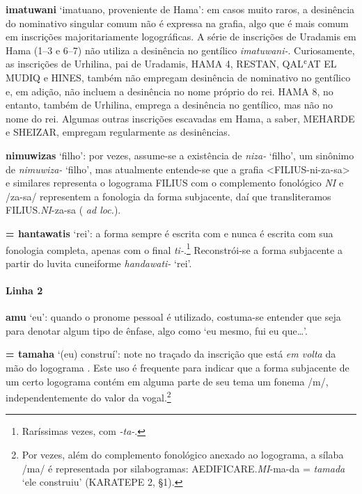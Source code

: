 \noindent\textbf{imatuwani} `imatuano, proveniente de Hama': em casos muito raros, a
desinência do nominativo singular comum não é expressa na grafia, algo que é
mais comum em inscrições majoritariamente logográficas. A série de inscrições de
Uradamis em Hama (1--3 e 6--7) não utiliza a desinência no gentílico
\emph{imatuwani-}.
Curiosamente, as inscrições de Urhilina, pai de Uradamis, HAMA 4,
RESTAN, QAL\textsc{ʿ}AT EL MUDIQ e HINES,
também não empregam desinência de nominativo no gentílico e, em adição, não
incluem a desinência no nome próprio do rei.
HAMA 8, no entanto, também de Urhilina, emprega a desinência no gentílico, mas
não no nome do rei.
Algumas outras inscrições escavadas em Hama, a saber, MEHARDE e SHEIZAR, empregam
regularmente as desinências.

\noindent\textbf{nimuwizas} `filho': por vezes, assume-se a existência de \emph{niza-}
`filho', um sinônimo de \emph{nimuwiza-} `filho', mas atualmente entende-se que
a grafia <FILIUS-ni-za-sa> e similares representa o logograma FILIUS com o
complemento fonológico \emph{NI} e /za-sa/ representem a fonologia da forma
subjacente, daí que transliteramos FILIUS.\emph{NI}-za-sa
( \emph{ad loc.}).

\noindent{} \textbf{= hantawatis} `rei': a forma sempre é escrita com  e
nunca é escrita com sua fonologia completa,
apenas com o final \emph{ti-}.\footnote{Raríssimas vezes, com \emph{-ta-}.}
Reconstrói-se a forma subjacente a partir do luvita cuneiforme
\emph{handawati-} `rei'.

\paragraph{Linha 2}
\textbf{amu} `eu': quando o pronome pessoal é utilizado, costuma-se entender que
seja para denotar algum tipo de ênfase, algo como `eu mesmo, fui eu que\ldots{}'.

\noindent{} \textbf{= tamaha} `(eu) construí': note no
traçado da inscrição que  está \emph{em volta} da mão do
logograma . Este uso é frequente para indicar que a
forma subjacente de um certo logograma contém em alguma parte de seu tema um
fonema /m/, independentemente do valor da vogal.\footnote{Por vezes, além
	do complemento fonológico anexado ao logograma, a sílaba /ma/ é representada
	por silabogramas: AEDIFICARE.\emph{MI}-ma-da = \emph{tamada} `ele construiu'
	(KARATEPE 2, §1).}

